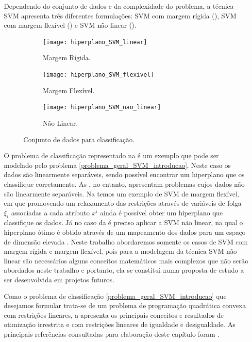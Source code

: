 \documentclass[12pt,a4paper]{scrartcl}
\theoremstyle{definition}%
\begin{document}
Dependendo do conjunto de dados e da complexidade do problema, a técnica SVM apresenta três diferentes formulações: SVM com margem rígida (), SVM com margem flexível () e SVM não linear (). 

\begin{figure}[!ht] 
\centering
\begin{subfigure}[h]{0.3\textwidth}
\centering
\texttt{[image: hiperplano\_SVM\_linear]}
\caption{Margem Rígida. \label{fig:hiperplano_margemrigida}}
\end{subfigure}
\begin{subfigure}[!ht]{0.3\textwidth}
	\centering
	\texttt{[image: hiperplano\_SVM\_flexivel]}
	\caption{Margem Flexível. \label{fig:hiperplano_margemflexivel}}
\end{subfigure}
\begin{subfigure}[!ht]{0.3\textwidth}
	\centering
	\texttt{[image: hiperplano\_SVM\_nao\_linear]}
	\caption{Não Linear. \label{fig:SVM_naolinear}}
\end{subfigure}
\caption{Conjunto de dados para classificação. \label{fig:distribuicao_dados_e_classificacao}}
\end{figure}

O problema de classificação representado na  é um exemplo que pode ser modelado pelo problema \eqref{problema_geral_SVM_introducao}. Neste caso os dados são linearmente separáveis, sendo possível encontrar um hiperplano que os classifique corretamente. As , no entanto, apresentam problemas cujos dados não são linearmente separáveis. Na  temos um exemplo de SVM de margem flexível, em que promovendo um relaxamento das restrições através de variáveis de folga $\xi_{i}$ associadas a cada atributo $x^{i}$ ainda é possível obter um hiperplano que classifique os dados. Já no caso da  é preciso aplicar a SVM não linear, na qual o hiperplano ótimo é obtido através de um mapeamento dos dados para um espaço de dimensão elevada \cite{Evelin2017}. Neste trabalho abordaremos somente os casos de SVM com margem rígida e margem flexível, pois para a modelagem da técnica SVM não linear são necessários alguns conceitos matemáticos mais complexos que não serão abordados neste trabalho e portanto, ela se constitui numa proposta de estudo a ser desenvolvida em projetos futuros.

Como o problema de classificação \eqref{problema_geral_SVM_introducao} que desejamos formular trata-se de um problema de programação quadrática convexa com restrições lineares, a  apresenta os principais conceitos e resultados de otimização irrestrita e com restrições lineares de igualdade e desigualdade. As principais referências consultadas para elaboração deste capítulo foram \textcite{Ana1994,Ademir2013,Izmailov2014ac,luenberger2008linear}.
\end{document}
